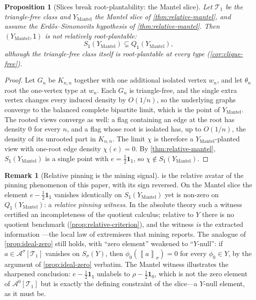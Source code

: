 \documentclass[11pt]{article}
\newtheorem{proposition}[proposition]{Proposition}
\theoremstyle{definition}
\newtheorem{remark}[remark]{Remark}
\newcommand{\A}{\mathcal{A}}
\newcommand{\T}{\mathcal{T}}
\newcommand{\avg}[2]{\left\llbracket #1 \right\rrbracket_{#2}}
\newcommand{\one}{\mathbf 1}
\newcommand{\vtype}{\mathsf{1}}
\begin{document}
\begin{proposition}[Slices break root-plantability: the Mantel slice]\label{prop:mantel-not-plantable}
Let $\T_1$ be the triangle-free class and $Y_{\mathrm{Mantel}}$ the Mantel slice of
\cref{thm:relative-mantel}, and assume the Erd\H{o}s--Simonovits hypothesis of
\cref{thm:relative-mantel}.  Then $(Y_{\mathrm{Mantel}},\vtype)$ is not relatively
root-plantable:
\[
  S_{\vtype}(Y_{\mathrm{Mantel}})\subsetneq Q_{\vtype}(Y_{\mathrm{Mantel}}),
\]
although the triangle-free class itself is root-plantable at every type
(\cref{cor:clique-free}).
\end{proposition}

\begin{proof}
Let $G_n$ be $K_{n,n}$ together with one additional isolated vertex $w_n$, and let
$\theta_n$ root the one-vertex type at $w_n$.  Each $G_n$ is triangle-free, and the
single extra vertex changes every induced density by $O(1/n)$, so the underlying graphs
converge to the balanced complete bipartite limit, which is the point of
$Y_{\mathrm{Mantel}}$.  The rooted views converge as well: a flag containing an edge at
the root has density $0$ for every $n$, and a flag whose root is isolated has, up to
$O(1/n)$, the density of its unrooted part in $K_{n,n}$.  The limit $\chi$ is therefore
a $Y_{\mathrm{Mantel}}$-planted view with one-root edge density $\chi(e)=0$.  By
\cref{thm:relative-mantel}, $S_{\vtype}(Y_{\mathrm{Mantel}})$ is a single point with
$e=\frac12\one_{\vtype}$, so $\chi\notin S_{\vtype}(Y_{\mathrm{Mantel}})$.
\end{proof}

\begin{remark}[Relative pinning is the mining signal]\label{rem:relative-pinning}
 is the relative avatar of the pinning phenomenon of
this paper, with its sign reversed.  On the Mantel slice the element
$e-\frac12\one_{\vtype}$ vanishes identically on $S_{\vtype}(Y_{\mathrm{Mantel}})$ yet is
non-zero on $Q_{\vtype}(Y_{\mathrm{Mantel}})$: a \emph{relative pinning witness}.  In
the absolute theory such a witness certified an incompleteness of the quotient
calculus; relative to $Y$ there is no quotient benchmark
(\cref{prop:relative-criterion}), and the witness \emph{is} the extracted information
---the local law of extremisers that mining reports.  The analogue of
\cref{prop:ideal-zero} still holds, with ``zero element'' weakened to ``$Y$-null'': if
$a\in\A^\sigma[\T_1]$ vanishes on $S_\sigma(Y)$, then $\phi_0(\avg{a}{\sigma})=0$ for
every $\phi_0\in Y$, by the argument of \cref{prop:ideal-zero} verbatim.  The Mantel
witness illustrates the sharpened conclusion: $e-\frac12\one_{\vtype}$ unlabels to
$\rho-\frac12\one_0$, which is not the zero element of $\A^0[\T_1]$ but is exactly the
defining constraint of the slice---a $Y$-null element, as it must be.
\end{remark}
\end{document}
